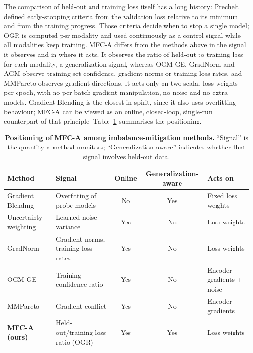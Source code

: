 \documentclass[fleqn,10pt]{wlscirep}
\begin{document}
The comparison of held-out and training loss itself has a long history: Prechelt\cite{prechelt1998early} defined early-stopping criteria from the validation loss relative to its minimum and from the training progress. Those criteria decide when to stop a single model; OGR is computed per modality and used continuously as a control signal while all modalities keep training. MFC-A differs from the methods above in the signal it observes and in where it acts. It observes the ratio of held-out to training loss for each modality, a generalization signal, whereas OGM-GE, GradNorm and AGM observe training-set confidence, gradient norms or training-loss rates, and MMPareto observes gradient directions. It acts only on two scalar loss weights per epoch, with no per-batch gradient manipulation, no noise and no extra models. Gradient Blending is the closest in spirit, since it also uses overfitting behaviour; MFC-A can be viewed as an online, closed-loop, single-run counterpart of that principle. Table~\ref{tab:relwork} summarises the positioning.

\begin{table}[t]
\caption{\textbf{Positioning of MFC-A among imbalance-mitigation methods.} ``Signal'' is the quantity a method monitors; ``Generalization-aware'' indicates whether that signal involves held-out data.}
\label{tab:relwork}
\centering
\small
\begin{tabularx}{\linewidth}{@{}lXccl@{}}
\toprule
\textbf{Method} & \textbf{Signal} & \textbf{Online} & \textbf{Generalization-aware} & \textbf{Acts on} \\ \midrule
Gradient Blending\cite{wang2020makes} & Overfitting of probe models & No & Yes & Fixed loss weights \\
Uncertainty weighting\cite{kendall2018multi} & Learned noise variance & Yes & No & Loss weights \\
GradNorm\cite{chen2018gradnorm} & Gradient norms, training-loss rates & Yes & No & Loss weights \\
OGM-GE\cite{peng2022balanced} & Training confidence ratio & Yes & No & Encoder gradients + noise \\
MMPareto\cite{wei2024mmpareto} & Gradient conflict & Yes & No & Encoder gradients \\
\textbf{MFC-A (ours)} & Held-out/training loss ratio (OGR) & Yes & Yes & Loss weights \\ \bottomrule
\end{tabularx}
\end{table}
\end{document}
